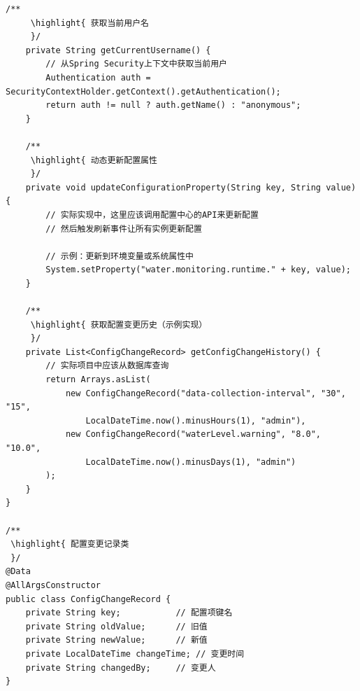\begin{lstlisting}[style=java]
    /**
     \highlight{ 获取当前用户名
     }/
    private String getCurrentUsername() {
        // 从Spring Security上下文中获取当前用户
        Authentication auth = SecurityContextHolder.getContext().getAuthentication();
        return auth != null ? auth.getName() : "anonymous";
    }
    
    /**
     \highlight{ 动态更新配置属性
     }/
    private void updateConfigurationProperty(String key, String value) {
        // 实际实现中，这里应该调用配置中心的API来更新配置
        // 然后触发刷新事件让所有实例更新配置
        
        // 示例：更新到环境变量或系统属性中
        System.setProperty("water.monitoring.runtime." + key, value);
    }
    
    /**
     \highlight{ 获取配置变更历史（示例实现）
     }/
    private List<ConfigChangeRecord> getConfigChangeHistory() {
        // 实际项目中应该从数据库查询
        return Arrays.asList(
            new ConfigChangeRecord("data-collection-interval", "30", "15", 
                LocalDateTime.now().minusHours(1), "admin"),
            new ConfigChangeRecord("waterLevel.warning", "8.0", "10.0", 
                LocalDateTime.now().minusDays(1), "admin")
        );
    }
}

/**
 \highlight{ 配置变更记录类
 }/
@Data
@AllArgsConstructor
public class ConfigChangeRecord {
    private String key;           // 配置项键名
    private String oldValue;      // 旧值
    private String newValue;      // 新值
    private LocalDateTime changeTime; // 变更时间
    private String changedBy;     // 变更人
}
\end{lstlisting}


